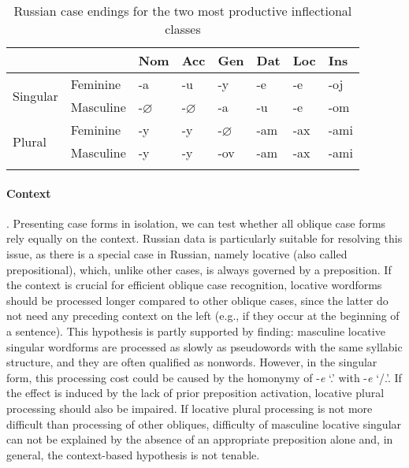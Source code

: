 \documentclass[output=paper, modfonts,newtxmath,hidelinks]{langscibook}
\begin{document}
\begin{table}
    \centering
	\caption{Russian case endings for the two most productive inflectional classes}
    \label{tab:rusDecl}
	\begin{tabular}{*{8}l}
		\lsptoprule
        ~	&	~	&	Nom    &	Acc	 & Gen  &	Dat &	Loc &	Ins	\\
        \midrule
		\multirow{2}{*}{Singular} & Feminine	&	-a  &	-u	&	-y	&	-e	& -e    &	-oj\\
		&	Masculine			&	-$\varnothing$  & -$\varnothing$    &	-a	&	-u	&   -e  &	-om	\\
        \midrule
        \multirow{2}{*}{Plural} & Feminine	& -y    & -y    &	-$\varnothing$ & -am  & -ax & -ami \\
        &	Masculine & -y  & -y &	-ov & -am    & -ax & -ami\\
		\lspbottomrule
    \end{tabular}
\end{table}

\paragraph*{Context}. Presenting case forms in isolation, we can test whether all oblique case forms  rely equally on the context. Russian data is particularly suitable for resolving this issue, as there is a special case in Russian, namely locative (also called prepositional), which, unlike other cases, is always governed by a preposition. If the context is crucial for efficient oblique case recognition, locative wordforms should be processed longer compared to other oblique cases, since the latter do not need any preceding context on the left (e.g., if they occur at the beginning of a sentence). This hypothesis is partly supported by  finding: masculine locative singular wordforms are processed as slowly as pseudowords with the same syllabic structure, and they are often qualified as nonwords. However, in the singular form, this processing cost could be caused by the homonymy of -\textit{e} `\locc.\masc' with  -\textit{e} `\datt/\locc.\fem'. If the effect is induced by the lack of prior preposition activation, locative plural processing should also be impaired. If locative plural processing is not more difficult than processing of other obliques, difficulty of masculine locative singular can not be explained by the absence of an appropriate preposition alone and, in general, the context-based hypothesis is not tenable. 
\end{document}
